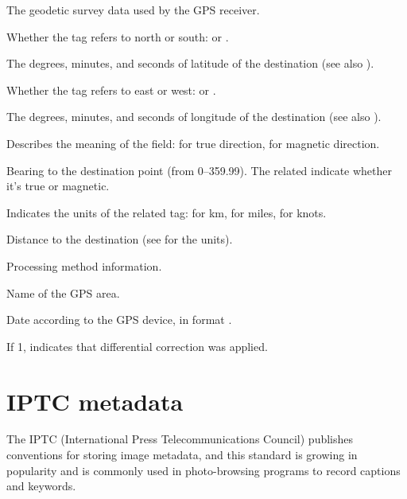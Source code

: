 \apiend

The geodetic survey data used by the GPS receiver.
\apiend

Whether the  tag refers to north or south:  or 
.
\apiend

The degrees, minutes, and seconds of latitude of the destination (see also 
).
\apiend

Whether the  tag refers to east or west:  or 
.
\apiend

The degrees, minutes, and seconds of longitude of the destination (see also 
).
\apiend

Describes the meaning of the  field:  for true
direction,  for magnetic direction.
\apiend

Bearing to the destination point (from 0--359.99).  The
related  indicate whether it's true or magnetic.
\apiend

Indicates the units of the related  tag: 
 for km,  for miles,  for knots.
\apiend

Distance to the destination (see  for the units).
\apiend

Processing method information.
\apiend

Name of the GPS area.
\apiend

Date according to the GPS device, in format .
\apiend

If 1, indicates that differential correction was applied.
\apiend



\section{IPTC metadata}
\label{sec:metadata:iptc}

The IPTC (International Press Telecommunications Council) publishes
conventions for storing image metadata, and this standard is growing
in popularity and is commonly used in photo-browsing programs to
record captions and keywords.

